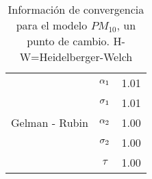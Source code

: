 \begin{table}[!h]
\begin{tabular}{|l|c|l|l|l|l|l|}
\multirow{5}{2.5cm}{Gelman - Rubin} & $\alpha_1$ & \multicolumn{5}{|c|}{1.01}\\ \cline{2-7}
&$\sigma_1$ &  \multicolumn{5}{|c|}{1.01} \\ \cline{2-7}
&$\alpha_2$ &  \multicolumn{5}{|c|}{1.00} \\ \cline{2-7}
&$\sigma_2$ &  \multicolumn{5}{|c|}{1.00} \\ \cline{2-7}
&$\tau$ &  \multicolumn{5}{|c|}{1.00} \\ \cline{1-7}



\end{tabular}
\caption{Información de convergencia para el modelo $PM_{10}$, un punto de cambio. H-W=Heidelberger-Welch}
\label{convergencia_updc_pm10}
\end{table}




